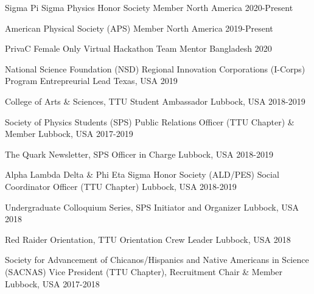 
\begin{cventries}

    \cventry
    {Sigma Pi Sigma Physics Honor Society}
    {Member}
    {North America}
    {2020-Present}
    {}

    \cventry
    {American Physical Society (APS)}
    {Member}
    {North America}
    {2019-Present}
    {}

    \cventry
    {PrivaC Female Only Virtual Hackathon}
    {Team Mentor}
    {Bangladesh}
    {2020}
    {}

    \cventry
    {National Science Foundation (NSD) Regional Innovation Corporations (I-Corps) Program}
    {Entrepreurial Lead}
    {Texas, USA}
    {2019}
    {}

    \cventry
    {College of Arts \& Sciences, TTU}
    {Student Ambassador}
    {Lubbock, USA}
    {2018-2019}
    {}

    \cventry
    {Society of Physics Students (SPS)}
    {Public Relations Officer (TTU Chapter) \& Member}
    {Lubbock, USA}
    {2017-2019}
    {}

    \cventry
    {The Quark Newsletter, SPS}
    {Officer in Charge}
    {Lubbock, USA}
    {2018-2019}
    {}

    \cventry
    {Alpha Lambda Delta \& Phi Eta Sigma Honor Society (ALD/PES)}
    {Social Coordinator Officer (TTU Chapter)}
    {Lubbock, USA}
    {2018-2019}
    {}

    \cventry
    {Undergraduate Colloquium Series, SPS}
    {Initiator and Organizer}
    {Lubbock, USA}
    {2018}
    {}


    \cventry
    {Red Raider Orientation, TTU}
    {Orientation Crew Leader}
    {Lubbock, USA}
    {2018}
    {}

    \cventry
    {Society for Advancement of Chicanos/Hispanics and Native Americans in Science (SACNAS)}
    {Vice President (TTU Chapter), Recruitment Chair \& Member}
    {Lubbock, USA}
    {2017-2018}
    {}


\end{cventries}

